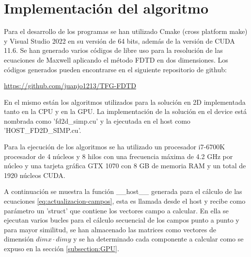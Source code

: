 \documentclass[11pt,a4paper,twoside,pdf]{article}
\numberwithin{equation}{section}
\begin{document}
\section{Implementación del algoritmo}
Para el desarrollo de los programas se han utilizado Cmake (cross platform make) y Visual Studio 2022 en su versión de 64 bits, además de la versión de CUDA 11.6.
Se han generado varios códigos de libre uso para la resolución de las ecuaciones de Maxwell aplicando el método FDTD en dos dimensiones. Los códigos generados pueden encontrarse en el siguiente repositorio de github:

\url{https://github.com/juanjo1213/TFG-FDTD}

En el mismo están los algoritmos utilizados para la solución en 2D implementada tanto en la CPU y en la GPU. La implementación de la solución en el device está nombrada como 'fd2d\_simp.cu' y la ejecutada en el host como 'HOST\_FD2D\_SIMP.cu'.



Para la ejecución de los algoritmos se ha utilizado un procesador i7-6700K procesador de 4 núcleos y 8 hilos con una frecuencia máxima de 4.2 GHz por núcleo y una tarjeta gráfica GTX 1070 con 8 GB de memoria RAM y un total de 1920 núcleos CUDA. 

A continuación se muestra la función \_\_host\_\_ generada para el cálculo de las ecuaciones \ref{eq:actualizacion-campos}, esta es llamada desde el host y recibe como parámetro un 'struct' que contiene los vectores campo a calcular. En ella se ejecutan varios bucles para el cálculo secuencial de los campos punto a punto y para mayor similitud, se han almacenado las matrices como vectores de dimensión $dimx\cdot dimy$ y se ha determinado cada componente a calcular como se expuso en la sección \ref{subsection:GPU}. 
\end{document}
